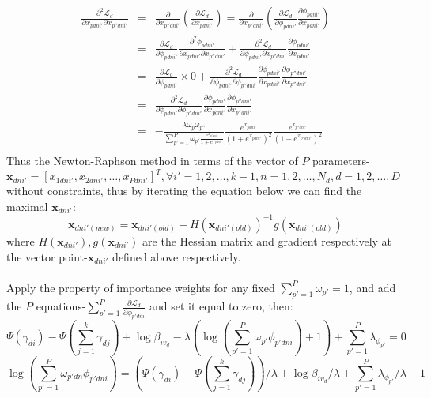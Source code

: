 \documentclass[a4paper]{article}
\newcommand{\be}{\begin{equation}}
\newcommand{\ee}{\end{equation}}
\newcommand{\bs}{\boldsymbol}
\newcommand{\ba}{\begin{array}}
\newcommand{\ea}{\end{array}}
\newcommand{\Sum}{\displaystyle\sum}
\begin{document}
\be
\ba{rcl}
\frac{\partial^2\mathcal{L}_d}{\partial x_{pdni'}\partial x_{p''dni'}}&=&\frac{\partial}{\partial x_{p''dni'}}\left(\frac{\partial\mathcal{L}_d}{\partial x_{pdni'}}\right)=\frac{\partial}{\partial x_{p''dni'}}\left(\frac{\partial\mathcal{L}_d}{\partial \phi_{pdni'}}\frac{\partial\phi_{pdni'}}{\partial x_{pdni'}}\right)\\
&=&\frac{\partial\mathcal{L}_d}{\partial \phi_{pdni'}}\frac{\partial^2\phi_{pdni'}}{\partial x_{pdni'}\partial x_{p''dni'}}+\frac{\partial^2\mathcal{L}_d}{\partial \phi_{pdni'}\partial x_{p''dni'}}\frac{\partial\phi_{pdni'}}{\partial x_{pdni'}}\\
&=&\frac{\partial\mathcal{L}_d}{\partial \phi_{pdni'}}\times 0+\frac{\partial^2\mathcal{L}_d}{\partial \phi_{pdni'}\partial \phi_{p''dni'}}\frac{\partial\phi_{pdni'}}{\partial x_{pdni'}}\frac{\partial\phi_{p''dni'}}{\partial x_{p''dni'}}\\
&=&\frac{\partial^2\mathcal{L}_d}{\partial \phi_{pdni'}\partial \phi_{p''dni'}}\frac{\partial\phi_{pdni'}}{\partial x_{pdni'}}\frac{\partial\phi_{p''dni'}}{\partial x_{p''dni'}}\\
&=&-\frac{\lambda\omega_p\omega_{p''}}{\sum_{p'=1}^{P}\omega_{p'}\frac{e^{x_{p'dni'}}}{1+e^{x_{p'dni'}}}}\frac{e^{x_{pdni'}}}{(1+e^{x_{pdni'}})^2}\frac{e^{x_{p''dni'}}}{(1+e^{x_{p''dni'}})^2}\\
\ea
\ee
Thus the Newton-Raphson method in terms of the vector of $P$ parameters-$\bs{x}_{dni'}=[x_{1dni'}, x_{2dni'}, \ldots, x_{Pdni'}]^T,\forall i'=1,2,\ldots,k-1,n=1,2,\ldots,N_d,d=1,2,\ldots,D$ without constraints, thus  by iterating the equation below we can find the maximal-$\bs{x}_{dni'}$:\\
\[
\bs{x}_{dni'(new)}=\bs{x}_{dni'(old)}-H(\bs{x}_{dni'(old)})^{-1}g(\bs{x}_{dni'(old)})
\]
where $H(\bs{x}_{dni'}),g(\bs{x}_{dni'})$ are the Hessian matrix and gradient respectively at the vector point-$\bs{x}_{dni'}$ defined above respectively.\\
\\
Apply the property of importance weights for any fixed $\Sum_{p'=1}^{P}\omega_{p'}=1$,
and add the $P$ equations-$\sum_{p'=1}^{P}\frac{\partial\mathcal{L}_d}{\partial \phi_{p'dni}}$ and set it equal to zero, then:\\
\[
\Psi(\gamma_{di})-\Psi(\sum_{j=1}^{k}\gamma_{dj})+\log\beta_{iv_d}-\lambda(\log(\sum_{p'=1}^{P}\omega_{p'
	}\phi_{p'dni})+1)+\sum_{p'=1}^{P}\lambda_{\phi_{p'}}=0
\]
\[
\log(\sum_{p'=1}^{P}\omega_{p'dn}\phi_{p'dni})=(\Psi(\gamma_{di})-\Psi(\sum_{j=1}^{k}\gamma_{dj}))/\lambda+\log\beta_{iv_d}/\lambda+\sum_{p'=1}^{P}\lambda_{\phi_{p'}}/\lambda-1
\]
\end{document}
